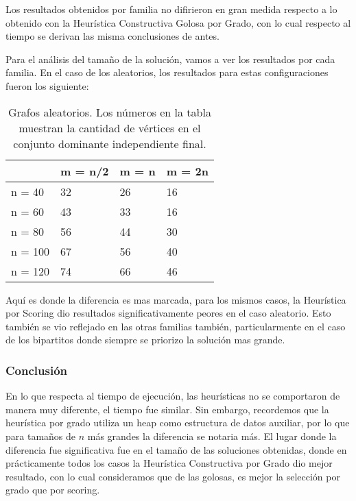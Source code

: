 Los resultados obtenidos por familia no difirieron en gran medida respecto a lo obtenido con la Heurística Constructiva Golosa por Grado, con lo cual respecto al tiempo se derivan las misma conclusiones de antes.

Para el análisis del tamaño de la solución, vamos a ver los resultados por cada familia. En el caso de los aleatorios, los resultados para estas configuraciones fueron los siguiente:

\begin{table}[H]
\centering
\label{my-label}
\begin{tabular}{|l|lll|}
\hline
        & \multicolumn{1}{l|}{m = n/2} & \multicolumn{1}{l|}{m = n} & m = 2n \\ \hline
n = 40  & 32                           & 26                         & 16     \\ \cline{1-1}
n = 60  & 43                           & 33                         & 16     \\ \cline{1-1}
n = 80  & 56                           & 44                         & 30     \\ \cline{1-1}
n = 100 & 67                           & 56                         & 40     \\ \cline{1-1}
n = 120 & 74                           & 66                         & 46     \\ \hline
\end{tabular}
\caption{Grafos aleatorios. Los números en la tabla muestran la cantidad de vértices en el conjunto dominante independiente final.}
\end{table}

Aquí es donde la diferencia es mas marcada, para los mismos casos, la Heurística por Scoring dio resultados significativamente peores en el caso aleatorio. Esto también se vio reflejado en las otras familias también, particularmente en el caso de los bipartitos donde siempre se priorizo la solución mas grande.

\subsubsection{Conclusión}

En lo que respecta al tiempo de ejecución, las heurísticas no se comportaron de manera muy diferente, el tiempo fue similar. Sin embargo, recordemos que la heurística por grado utiliza un heap como estructura de datos auxiliar, por lo que para tamaños de $n$ más grandes la diferencia se notaria más. El lugar donde la diferencia fue significativa fue en el tamaño de las soluciones obtenidas, donde en prácticamente todos los casos la Heurística Constructiva por Grado dio mejor resultado, con lo cual consideramos que de las golosas, es mejor la selección por grado que por scoring.